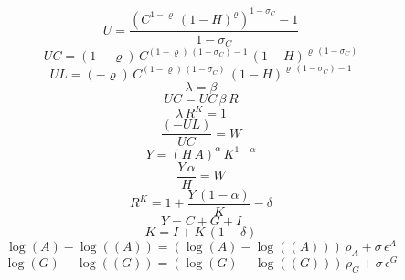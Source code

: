 \begin{dmath}
{U}=\frac{\left({C}^{1-{{\varrho}}}\, \left(1-{H}\right)^{{{\varrho}}}\right)^{1-{{\sigma_{C}}}}-1}{1-{{\sigma_{C}}}}
\end{dmath}
\begin{dmath}
{UC}=\left(1-{{\varrho}}\right)\, {C}^{\left(1-{{\varrho}}\right)\, \left(1-{{\sigma_{C}}}\right)-1}\, \left(1-{H}\right)^{{{\varrho}}\, \left(1-{{\sigma_{C}}}\right)}
\end{dmath}
\begin{dmath}
{UL}=\left(-{{\varrho}}\right)\, {C}^{\left(1-{{\varrho}}\right)\, \left(1-{{\sigma_{C}}}\right)}\, \left(1-{H}\right)^{{{\varrho}}\, \left(1-{{\sigma_{C}}}\right)-1}
\end{dmath}
\begin{dmath}
{\lambda}={{\beta}}
\end{dmath}
\begin{dmath}
{UC}={UC}\, {{\beta}}\, {R}
\end{dmath}
\begin{dmath}
{\lambda}\, {R^{K}}=1
\end{dmath}
\begin{dmath}
\frac{\left(-{UL}\right)}{{UC}}={W}
\end{dmath}
\begin{dmath}
{Y}=\left({H}\, {A}\right)^{{{\alpha}}}\, {K}^{1-{{\alpha}}}
\end{dmath}
\begin{dmath}
\frac{{Y}\, {{\alpha}}}{{H}}={W}
\end{dmath}
\begin{dmath}
{R^{K}}=1+\frac{{Y}\, \left(1-{{\alpha}}\right)}{{K}}-{{\delta}}
\end{dmath}
\begin{dmath}
{Y}={C}+{G}+{I}
\end{dmath}
\begin{dmath}
{K}={I}+{K}\, \left(1-{{\delta}}\right)
\end{dmath}
\begin{dmath}
\log\left({A}\right)-\log\left(({A})\right)=\left(\log\left({A}\right)-\log\left(({A})\right)\right)\, {{\rho_{A}}}+{{\sigma}}\, {{\epsilon^{A}}}
\end{dmath}
\begin{dmath}
\log\left({G}\right)-\log\left(({G})\right)=\left(\log\left({G}\right)-\log\left(({G})\right)\right)\, {{\rho_{G}}}+{{\sigma}}\, {{\epsilon^{G}}}
\end{dmath}
